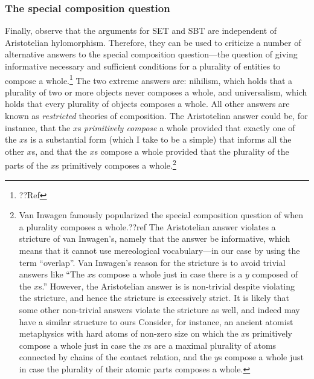 \subsubsection{The special composition question}
Finally, observe that the arguments for SET and SBT are independent of Aristotelian hylomorphism. Therefore, they can be used
to criticize a number of alternative answers to the special composition question---the question of giving informative 
necessary and sufficient conditions for a plurality of entities to compose a whole.\footnote{??Ref}  The two extreme answers are: nihilism, which holds that a plurality of two or more objects never 
composes a whole, and universalism, which holds that every plurality of objects composes a whole. All other answers are known 
as \textit{restricted} theories of composition. The Aristotelian answer could be, for instance, that the $x$s \textit{primitively compose} a whole provided that exactly one of the $x$s is a substantial form (which I take to be a simple) that informs all the 
other $x$s, and that the $x$s compose a whole provided that the plurality of the parts of the $x$s primitively composes a 
whole.\footnote{Van Inwagen famously popularized the special composition question of when a plurality
composes a whole.??ref The Aristotelian answer violates a stricture of van Inwagen's, namely that the answer be informative,
which means that it cannot use mereological vocabulary---in our case by using the term ``overlap''. Van Inwagen's reason for 
the stricture is to avoid trivial answers like ``The $x$s compose a whole just in case there is a $y$ composed of the $x$s.'' 
However, the Aristotelian answer is is non-trivial despite violating the stricture, and hence the stricture is 
excessively strict. It is likely that some other non-trivial answers violate the stricture as well, and indeed may have a similar structure to ours Consider, for instance, an ancient atomist metaphysics with hard atoms of non-zero size 
on which the $x$s primitively compose a whole just in case the $x$s are a maximal plurality of atoms connected by chains of 
the contact relation, and the $y$s compose a whole just in case the plurality of their atomic parts composes a whole.}

